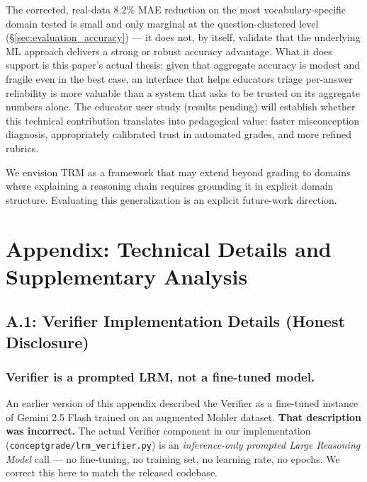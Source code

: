 \documentclass[journal,review]{vgtc}
\begin{document}
The corrected, real-data $8.2\%$ MAE reduction on the most vocabulary-specific domain tested is small and only marginal at the question-clustered level (\S\ref{sec:evaluation_accuracy}) --- it does not, by itself, validate that the underlying ML approach delivers a strong or robust accuracy advantage. What it does support is this paper's actual thesis: given that aggregate accuracy is modest and fragile even in the best case, an interface that helps educators triage per-answer reliability is more valuable than a system that asks to be trusted on its aggregate numbers alone. The educator user study (results pending) will establish whether this technical contribution translates into pedagogical value: faster misconception diagnosis, appropriately calibrated trust in automated grades, and more refined rubrics.

We envision TRM as a framework that may extend beyond grading to domains where explaining a reasoning chain requires grounding it in explicit domain structure. Evaluating this generalization is an explicit future-work direction.


\appendix

\section{Appendix: Technical Details and Supplementary Analysis}

\subsection{A.1: Verifier Implementation Details (Honest Disclosure)}

\subsubsection{Verifier is a prompted LRM, not a fine-tuned model.}

An earlier version of this appendix described the Verifier as a
fine-tuned instance of Gemini 2.5 Flash trained on an augmented Mohler
dataset. \textbf{That description was incorrect.} The actual Verifier
component in our implementation
(\texttt{conceptgrade/lrm\_verifier.py}) is an \emph{inference-only
prompted Large Reasoning Model} call --- no fine-tuning, no training set,
no learning rate, no epochs. We correct this here to match the released
codebase.
\end{document}
